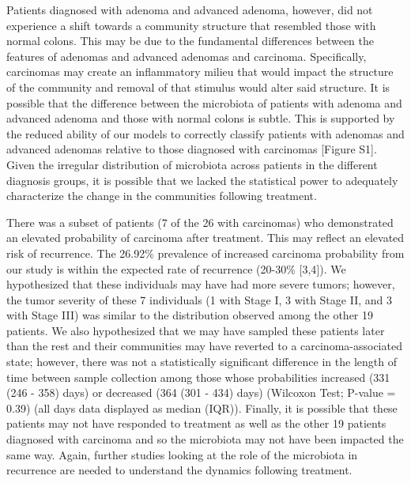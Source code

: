 \documentclass[12pt,]{article}
\begin{document}
Patients diagnosed with adenoma and advanced adenoma, however, did not
experience a shift towards a community structure that resembled those
with normal colons. This may be due to the fundamental differences
between the features of adenomas and advanced adenomas and carcinoma.
Specifically, carcinomas may create an inflammatory milieu that would
impact the structure of the community and removal of that stimulus would
alter said structure. It is possible that the difference between the
microbiota of patients with adenoma and advanced adenoma and those with
normal colons is subtle. This is supported by the reduced ability of our
models to correctly classify patients with adenomas and advanced
adenomas relative to those diagnosed with carcinomas {[}Figure S1{]}.
Given the irregular distribution of microbiota across patients in the
different diagnosis groups, it is possible that we lacked the
statistical power to adequately characterize the change in the
communities following treatment.

There was a subset of patients (7 of the 26 with carcinomas) who
demonstrated an elevated probability of carcinoma after treatment. This
may reflect an elevated risk of recurrence. The 26.92\% prevalence of
increased carcinoma probability from our study is within the expected
rate of recurrence (20-30\% {[}3,4{]}). We hypothesized that these
individuals may have had more severe tumors; however, the tumor severity
of these 7 individuals (1 with Stage I, 3 with Stage II, and 3 with
Stage III) was similar to the distribution observed among the other 19
patients. We also hypothesized that we may have sampled these patients
later than the rest and their communities may have reverted to a
carcinoma-associated state; however, there was not a statistically
significant difference in the length of time between sample collection
among those whose probabilities increased (331 (246 - 358) days) or
decreased (364 (301 - 434) days) (Wilcoxon Test; P-value = 0.39) (all
days data displayed as median (IQR)). Finally, it is possible that these
patients may not have responded to treatment as well as the other 19
patients diagnosed with carcinoma and so the microbiota may not have
been impacted the same way. Again, further studies looking at the role
of the microbiota in recurrence are needed to understand the dynamics
following treatment.
\end{document}
